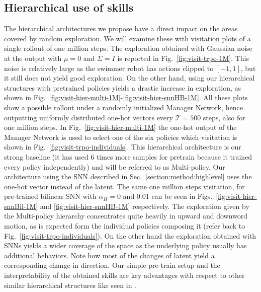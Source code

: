 \documentclass{article} %
\begin{document}

\subsection{Hierarchical use of skills}

The hierarchical architectures we propose have a direct impact on the areas covered by random exploration. We will examine these with visitation plots of a single rollout of one million steps. The exploration obtained with Gaussian noise at the output with $\mu=0$ and $\Sigma=I$ is reported in Fig.\ \ref{fig:visit-trpo-1M}. This noise is relatively large as the swimmer robot has actions clipped to $[-1,1]$, but it still does not yield good exploration. On the other hand, using our hierarchical structures with pretrained policies yields a drastic increase in exploration, as shown in Fig.\ \ref{fig:visit-hier-multi-1M}-\ref{fig:visit-hier-snnHB-1M}. All these plots show a possible rollout under a randomly initialized Manager Network, hence outputting uniformly distributed one-hot vectors every $\mathcal{T}=500$ steps, also for one million steps. In Fig.\ \ref{fig:visit-hier-multi-1M} the one-hot output of the Manager Network is used to select one of the six policies which visitation is shown in Fig.\ \ref{fig:visit-trpo-individuals}. This hierarchical architecture is our strong baseline (it has used 6 times more samples for pretrain because it trained every policy independently) and will be referred to as Multi-policy. Our architecture using the SNN described in Sec.\ \ref{section:method:highlevel} uses the one-hot vector instead of the latent. The same one million steps visitation, for pre-trained bilinear SNN with $\alpha_H= 0$ and 0.01 can be seen in Figs.\ \ref{fig:visit-hier-snnBil-1M} and \ref{fig:visit-hier-snnHB-1M} respectively. The exploration given by the Multi-policy hierarchy concentrates quite heavily in upward and downword motion, as is expected form the individual policies composing it (refer back to Fig.\ \ref{fig:visit-trpo-individuals}). On the other hand the exploration obtained with SNNs yields a wider coverage of the space as the underlying policy usually has additional behaviors. Note how most of the changes of latent yield a corresponding change in direction. Our simple pre-train setup and the interpretability of the obtained skills are key advantages with respect to other similar hierarchical structures like seen in \citet{heess2016learning}.
\end{document}

